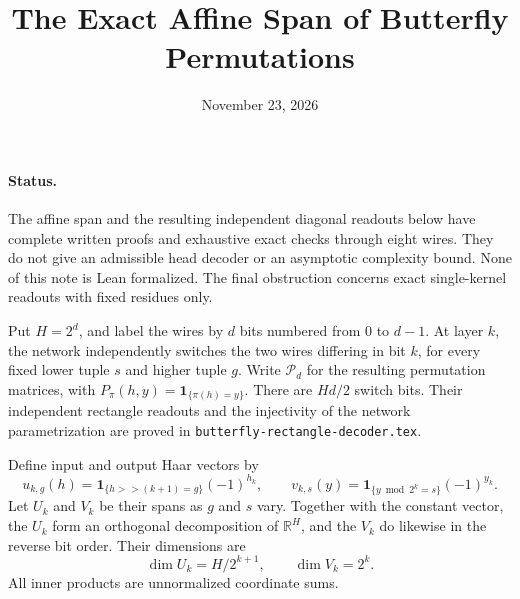\documentclass[11pt]{article}
\title{The Exact Affine Span of Butterfly Permutations}
\author{}
\date{November 23, 2026}
\begin{document}
\maketitle

\paragraph{Status.}
The affine span and the resulting independent diagonal readouts below have
complete written proofs and exhaustive exact checks through eight wires.
They do not give an admissible head decoder or an asymptotic complexity
bound. None of this note is Lean formalized. The final obstruction concerns
exact single-kernel readouts with fixed residues only.

Put $H=2^d$, and label the wires by $d$ bits numbered from $0$ to $d-1$.
At layer $k$, the network independently switches the two wires differing
in bit $k$, for every fixed lower tuple $s$ and higher tuple $g$.
Write $\mathcal P_d$ for the resulting permutation matrices, with
$P_\pi(h,y)=\mathbf1_{\{\pi(h)=y\}}$.
There are $Hd/2$ switch bits. Their independent rectangle readouts and the
injectivity of the network parametrization are proved in
\texttt{butterfly-rectangle-decoder.tex}.

Define input and output Haar vectors by
\[
 u_{k,g}(h)=\mathbf1_{\{h>>(k+1)=g\}}(-1)^{h_k},
 \qquad
 v_{k,s}(y)=\mathbf1_{\{y\bmod 2^k=s\}}(-1)^{y_k}.
\]
Let $U_k$ and $V_k$ be their spans as $g$ and $s$ vary.
Together with the constant vector, the $U_k$ form an orthogonal
 decomposition of $\mathbb R^H$, and the $V_k$ do likewise in the reverse
bit order. Their dimensions are
\[
 \dim U_k=H/2^{k+1},\qquad \dim V_k=2^k.
\]
All inner products are unnormalized coordinate sums.
\end{document}
